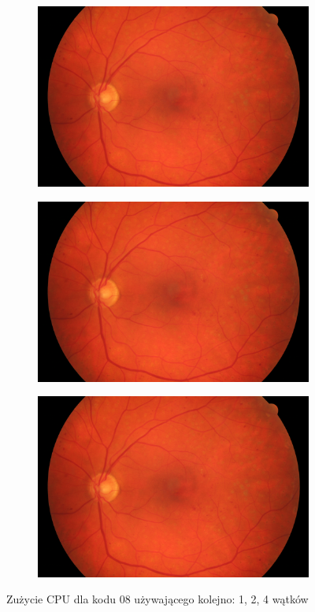\documentclass[12pt]{article}
\begin{document}
\begin{figure}[h!]
	\begin{subfigure}[b]{0.32\linewidth}
		\includegraphics[width=\linewidth]{images/01_dr.jpg}
	\end{subfigure}
	\begin{subfigure}[b]{0.32\linewidth}
		\includegraphics[width=\linewidth]{images/01_dr.jpg}
	\end{subfigure}
	\begin{subfigure}[b]{0.32\linewidth}
		\includegraphics[width=\linewidth]{images/01_dr.jpg}
	\end{subfigure}
	\caption{Zużycie CPU dla kodu 08 używającego kolejno: 1, 2, 4 wątków}
\end{figure}
\end{document}
